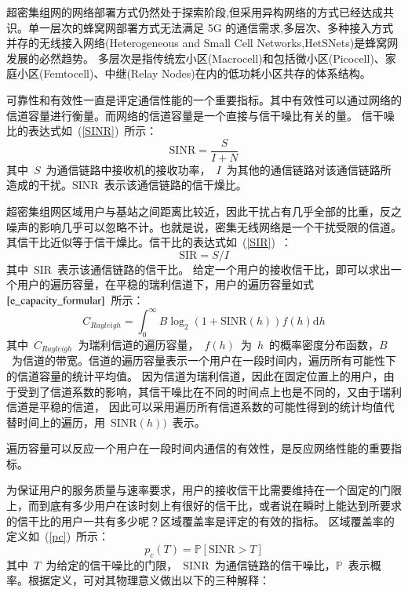 超密集组网的网络部署方式仍然处于探索阶段,但采用异构网络的方式已经达成共识。单一层次的蜂窝网部署方式无法满足 5G 的通信需求,多层次、多种接入方式并存的无线接入网络(Heterogeneous and Small Cell Networks,HetSNets)是蜂窝网发展的必然趋势。
多层次是指传统宏小区(Macrocell)和包括微小区(Picocell)、家庭小区(Femtocell)、中继(Relay Nodes)在内的低功耗小区共存的体系结构。


可靠性和有效性一直是评定通信性能的一个重要指标。其中有效性可以通过网络的信道容量进行衡量。而网络的信道容量是一个直接与信干噪比有关的量。
信干噪比的表达式如~(\ref{SINR})~所示：
\begin{equation}\label{SINR}
  \mathrm{SINR}=\frac{S}{I+N}
\end{equation}
其中~$S$~为通信链路中接收机的接收功率，~$I$~为其他的通信链路对该通信链路所造成的干扰。$\mathrm{SINR}$~表示该通信链路的信干燥比。

超密集组网区域用户与基站之间距离比较近，因此干扰占有几乎全部的比重，反之噪声的影响几乎可以忽略不计。也就是说，密集无线网络是一个干扰受限的信道。其信干比近似等于信干燥比。信干比的表达式如~(\ref{SIR})~：
\begin{equation}\label{SIR}
  \mathrm{SIR}=S/I
\end{equation}
其中~$\mathrm{SIR}$~表示该通信链路的信干比。
给定一个用户的接收信干比，即可以求出一个用户的遍历容量，在平稳的瑞利信道下，用户的遍历容量如式~$\ref{e_capacity_formular}$~所示：
\begin{equation}\label{e_capacity_formular}
  C_{Rayleigh} = \int_{0}^{\infty} B \log_2(1+\mathrm{SINR}(h)) f(h) \mathrm{d} h
\end{equation}
其中~$C_{Rayleigh}$~为瑞利信道的遍历容量，~$f(h)$~为~$h$~的概率密度分布函数，$B$~为信道的带宽。信道的遍历容量表示一个用户在一段时间内，遍历所有可能性下的信道容量的统计平均值。
因为信道为瑞利信道，因此在固定位置上的用户，由于受到了信道系数的影响，其信干噪比在不同的时间点上也是不同的，又由于瑞利信道是平稳的信道，
因此可以采用遍历所有信道系数的可能性得到的统计均值代替时间上的遍历，用~$\mathrm{SINR}(h))$~表示。

遍历容量可以反应一个用户在一段时间内通信的有效性，是反应网络性能的重要指标。

为保证用户的服务质量与速率要求，用户的接收信干比需要维持在一个固定的门限上，而到底有多少用户在该时刻上有很好的信干比，或者说在瞬时上能达到所要求的信干比的用户一共有多少呢？区域覆盖率是评定的有效的指标。
区域覆盖率的定义如~(\ref{pc})~所示：
\begin{equation}\label{pc}
  p_c(T) = \mathbb{P}[\mathrm{SINR}>T]
\end{equation}
其中~$T$~为给定的信干噪比的门限，~$\mathrm{SINR}$~为通信链路的信干噪比，$\mathbb{P}$~表示概率。根据定义，可对其物理意义做出以下的三种解释：

